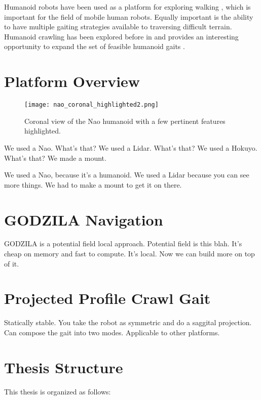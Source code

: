 Humanoid robots have been used as a platform for exploring walking
\cite{Vukobratovic1969, Geijtenbeek2013, Deits2014}, which is important for the
field of mobile human robots. Equally important is the ability to have multiple
gaiting strategies available to traversing difficult terrain.
Humanoid crawling has been explored before in \cite{Li2011, Li_crawlingposture, 
righetti2006} and provides an interesting opportunity to expand the set of
feasible humanoid gaits \cite{Brooks2015}.

\section{Platform Overview}

\begin{figure}
	\centering
	\texttt{[image: nao\_coronal\_highlighted2.png]}
    \caption{Coronal view of the Nao humanoid with a few pertinent features 
             highlighted.}
	\label{fig:nao_diagram1}
\end{figure}

We used a Nao. What's that?
We used a Lidar. What's that? We used a Hokuyo. What's that?
We made a mount.

We used a Nao, because it's a humanoid.
We used a Lidar because you can see more things.
We had to make a mount to get it on there.


\section{GODZILA Navigation}
GODZILA is a potential field local approach.
Potential field is this blah.
It's cheap on memory and fast to compute.
It's local. Now we can build more on top of it.

\section{Projected Profile Crawl Gait}
Statically stable.
You take the robot as symmetric and do a saggital projection.
Can compose the gait into two modes.
Applicable to other platforms.

\section{Thesis Structure}
This thesis is organized as follows: 

